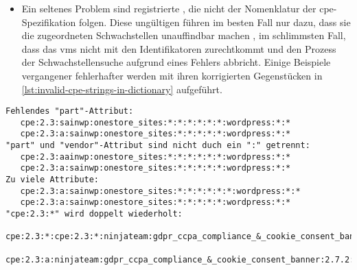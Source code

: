 \begin{itemize}
    \item Ein seltenes Problem sind registrierte , die nicht der Nomenklatur der \acrshort{cpe}-Spezifikation folgen.
    Diese ungültigen  führen im besten Fall nur dazu, dass sie die zugeordneten Schwachstellen unauffindbar machen \autocite{Takahashi_Miyamoto_Nakao_2016}, im schlimmsten Fall, dass das \acrshort{vms} nicht mit den Identifikatoren zurechtkommt und den Prozess der Schwachstellensuche aufgrund eines Fehlers abbricht.
    Einige Beispiele vergangener fehlerhafter  werden mit ihren korrigierten Gegenstücken in \autoref{lst:invalid-cpe-strings-in-dictionary} aufgeführt.
\end{itemize}

\begin{lstlisting}[caption=Ungültige CPE 2.3 Format Strings aus dem NVD CPE Dictionary und ihre korrigierten Gegenstücke,label=lst:invalid-cpe-strings-in-dictionary]
Fehlendes "part"-Attribut:
   cpe:2.3:sainwp:onestore_sites:*:*:*:*:*:*:wordpress:*:*
   cpe:2.3:a:sainwp:onestore_sites:*:*:*:*:*:wordpress:*:*
"part" und "vendor"-Attribut sind nicht duch ein ":" getrennt:
   cpe:2.3:aainwp:onestore_sites:*:*:*:*:*:*:wordpress:*:*
   cpe:2.3:a:sainwp:onestore_sites:*:*:*:*:*:wordpress:*:*
Zu viele Attribute:
   cpe:2.3:a:sainwp:onestore_sites:*:*:*:*:*:*:wordpress:*:*
   cpe:2.3:a:sainwp:onestore_sites:*:*:*:*:*:wordpress:*:*
"cpe:2.3:*" wird doppelt wiederholt:
   cpe:2.3:*:cpe:2.3:*:ninjateam:gdpr_ccpa_compliance_&_cookie_consent_banner:2.7.2:*:*:*:*:wordpress:*:*
   cpe:2.3:a:ninjateam:gdpr_ccpa_compliance_&_cookie_consent_banner:2.7.2:*:*:*:*:wordpress:*:*
\end{lstlisting}


